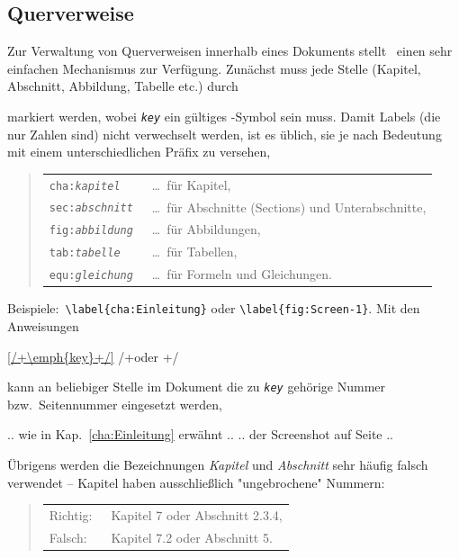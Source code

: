 \subsection{Querverweise}
\label{sec:querverweise}

Zur Verwaltung von Querverweisen innerhalb eines Dokuments stellt \latex\
einen sehr einfachen Mechanismus zur Verfügung. Zunächst muss jede Stelle
(Kapitel, Abschnitt, Abbildung, Tabelle etc.) durch
%
\begin{LaTeXCode}[numbers=none]
\label{/+\emph{key}+/}
\end{LaTeXCode}
%
markiert werden, wobei \texttt{\em key} ein gültiges \latex-Symbol sein muss.
Damit Labels (die nur Zahlen sind) nicht verwechselt werden, ist es üblich,
sie je nach Bedeutung mit einem unterschiedlichen Präfix zu versehen, \zB\
%
\begin{quote}
    \begin{tabular}{ll}
        \verb!cha:!\texttt{\em kapitel} & \ \ldots\ für Kapitel,
        \\
        \verb!sec:!\texttt{\em abschnitt} & \ \ldots\ für Abschnitte
        (Sections) und Unterabschnitte,
        \\
        \verb!fig:!\texttt{\em abbildung} & \ \ldots\ für Abbildungen,
        \\
        \verb!tab:!\texttt{\em tabelle} & \ \ldots\ für Tabellen,
        \\
        \verb!equ:!\texttt{\em gleichung} & \ \ldots\ für Formeln und
        Gleichungen.
    \end{tabular}
\end{quote}
%
\noindent
Beispiele:\ \verb!\label{cha:Einleitung}! oder \verb!\label{fig:Screen-1}!.
Mit den Anweisungen
%
\begin{LaTeXCode}[numbers=none]
\ref{/+\emph{key}+/} /+\quad oder \quad+/ 
\end{LaTeXCode}
%
kann an beliebiger Stelle im Dokument die zu \texttt{\emph{key}} gehörige
Nummer bzw.\ Seitennummer eingesetzt werden, \zB\
%
\begin{LaTeXCode}[numbers=none]
.. wie in Kap.~\ref{cha:Einleitung} erwähnt ..
.. der Screenshot auf Seite \pageref{fig:Screen-1} ..
\end{LaTeXCode}
%
Übrigens werden die Bezeichnungen \emph{Kapitel} und \emph{Abschnitt} sehr
häufig falsch verwendet -- Kapitel haben ausschließlich "ungebrochene" Nummern:
%
\begin{quote}
    \begin{tabular}{ll}
        \textrm{Richtig:\ } & Kapitel 7 oder Abschnitt 2.3.4,\\
        \textrm{Falsch:\ }  & Kapitel 7.2 oder Abschnitt 5.
    \end{tabular}
\end{quote}


